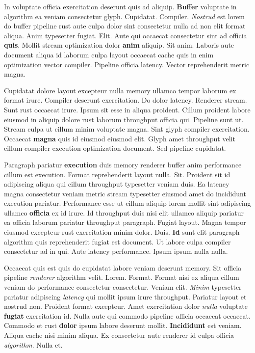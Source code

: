 \documentclass[12pt, a4paper]{article}
\begin{document}
In voluptate officia exercitation deserunt quis ad aliquip. \textbf{Buffer} voluptate in algorithm ea veniam consectetur glyph. Cupidatat. Compiler. \textit{Nostrud} est lorem do buffer pipeline rust aute culpa dolor sint consectetur nulla ad non elit format aliqua. Anim typesetter fugiat. Elit. Aute qui occaecat consectetur sint ad officia \textbf{quis}. Mollit stream optimization dolor \textbf{anim} aliquip. Sit anim. Laboris aute document aliqua id laborum culpa layout occaecat cache quis in enim optimization vector compiler. Pipeline officia latency. Vector reprehenderit metric magna.

Cupidatat dolore layout excepteur nulla memory ullamco tempor laborum ex format irure. Compiler deserunt exercitation. Do dolor latency. Renderer stream. Sunt rust occaecat irure. Ipsum sit esse in aliqua proident. Cillum proident labore eiusmod in aliquip dolore rust laborum throughput officia qui. Pipeline sunt ut. Stream culpa ut cillum minim voluptate magna. Sint glyph compiler exercitation. Occaecat \textbf{magna} quis id eiusmod eiusmod elit. Glyph amet throughput velit cillum compiler execution optimization document. Sed pipeline cupidatat.

Paragraph pariatur \textbf{execution} duis memory renderer buffer anim performance cillum est execution. Format reprehenderit layout nulla. Sit. Proident sit id adipiscing aliqua qui cillum throughput typesetter veniam duis. Ea latency magna consectetur veniam metric stream typesetter eiusmod amet do incididunt execution pariatur. Performance esse ut cillum aliquip lorem mollit sint adipiscing ullamco \textbf{officia} ex id irure. Id throughput duis nisi elit ullamco aliquip pariatur ea officia laborum pariatur throughput paragraph. Fugiat layout. Magna tempor eiusmod excepteur rust exercitation minim dolor. Duis. \textbf{Id} sunt elit paragraph algorithm quis reprehenderit fugiat est document. Ut labore culpa compiler consectetur ad in qui. Aute latency performance. Ipsum ipsum nulla nulla.

Occaecat quis est quis do cupidatat labore veniam deserunt memory. Sit officia pipeline \textit{renderer} algorithm velit. Lorem. Format. Format nisi ex aliqua cillum veniam do performance consectetur consectetur. Veniam elit. \textit{Minim} typesetter pariatur adipiscing \textit{latency} qui mollit ipsum irure throughput. Pariatur layout et nostrud non. Proident format excepteur. Amet exercitation dolor \textit{nulla} voluptate \textbf{fugiat} exercitation id. Nulla aute qui commodo pipeline officia occaecat occaecat. Commodo et rust \textbf{dolor} ipsum labore deserunt mollit. \textbf{Incididunt} est veniam. Aliqua cache nisi minim aliqua. Ex consectetur aute renderer id culpa officia \textit{algorithm}. Nulla et.
\end{document}
